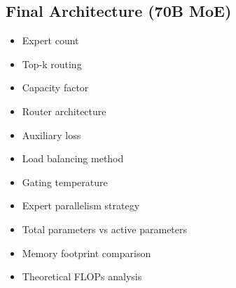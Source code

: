     \subsection{Final Architecture (70B MoE)}
    \begin{itemize}
        \item  Expert count
        \item Top-k routing
        \item Capacity factor
        \item Router architecture
        \item Auxiliary loss
        \item Load balancing method
        \item Gating temperature
        \item Expert parallelism strategy
        \item Total parameters vs active parameters
        \item Memory footprint comparison
        \item Theoretical FLOPs analysis
    \end{itemize}
